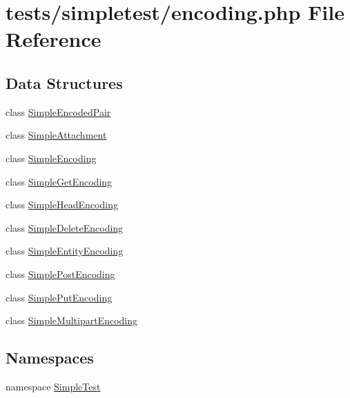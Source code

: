 \hypertarget{encoding_8php}{\section{tests/simpletest/encoding.php File Reference}
\label{encoding_8php}
}
\subsection*{Data Structures}
\begin{DoxyCompactItemize}
\item 
class \hyperlink{class_simple_encoded_pair}{Simple\-Encoded\-Pair}
\item 
class \hyperlink{class_simple_attachment}{Simple\-Attachment}
\item 
class \hyperlink{class_simple_encoding}{Simple\-Encoding}
\item 
class \hyperlink{class_simple_get_encoding}{Simple\-Get\-Encoding}
\item 
class \hyperlink{class_simple_head_encoding}{Simple\-Head\-Encoding}
\item 
class \hyperlink{class_simple_delete_encoding}{Simple\-Delete\-Encoding}
\item 
class \hyperlink{class_simple_entity_encoding}{Simple\-Entity\-Encoding}
\item 
class \hyperlink{class_simple_post_encoding}{Simple\-Post\-Encoding}
\item 
class \hyperlink{class_simple_put_encoding}{Simple\-Put\-Encoding}
\item 
class \hyperlink{class_simple_multipart_encoding}{Simple\-Multipart\-Encoding}
\end{DoxyCompactItemize}
\subsection*{Namespaces}
\begin{DoxyCompactItemize}
\item 
namespace \hyperlink{namespace_simple_test}{Simple\-Test}
\end{DoxyCompactItemize}
